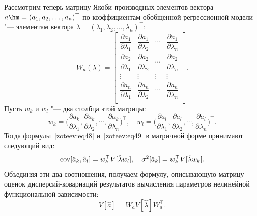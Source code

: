 Рассмотрим теперь матрицу Якоби производных элементов вектора $a\hm=(a_1,a_2,\dots,a_n)^{\top}$ по коэффициентам обобщенной регрессионной модели "--- элементам вектора $\lambda=(\lambda_1, \lambda_2,\dots,\lambda_n)^{\top}$:
$$
W_a(\lambda)=\begin{bmatrix}
\dfrac{\partial a_1}{\partial \lambda_1} & \dfrac{\partial a_1}{\partial \lambda_2} & \cdots & \dfrac{\partial a_1}{\partial \lambda_n} \\
\dfrac{\partial a_2}{\partial \lambda_1} & \dfrac{\partial a_2}{\partial \lambda_2} & \cdots & \dfrac{\partial a_2}{\partial \lambda_n} \\
\vdots & \vdots  & \vdots & \vdots \\
\dfrac{\partial a_n}{\partial \lambda_1} & \dfrac{\partial a_n}{\partial \lambda_2} & \cdots & \dfrac{\partial a_n}{\partial \lambda_n} \\
\end{bmatrix}.
$$
Пусть $w_k$ и $w_l$ "--- два столбца этой матрицы:
$$w_k=\Big(\dfrac{\partial a_k}{\partial \lambda_1}, \dfrac{\partial a_k}{\partial \lambda_2},\cdots, \dfrac{\partial a_k}{\partial \lambda_n}\Big)^{\top},  \quad 
w_l=\Big(\dfrac{\partial a_l}{\partial \lambda_1}, \dfrac{\partial a_l}{\partial \lambda_2},\cdots, \dfrac{\partial a_l}{\partial \lambda_n}\Big)^{\top}.$$
Тогда формулы~\eqref{zoteev:eq48} и~\eqref{zoteev:eq49} в матричной форме принимают следующий вид: 
$$
\mathop{\rm cov}[\hat{a}_k,\hat{a}_l]=w_k^{\top}V[\hat{\lambda}w_l], \quad \sigma^2[\hat{a}_k]=w_k^{\top}V[\hat{\lambda}w_k].$$ 
Объединяя эти два соотношения, получаем формулу, описывающую матрицу оценок дисперсий-ковариаций результатов вычисления параметров нелинейной функциональной зависимости:
\begin{equation}
V[\hat{a}]=W_aV[\hat{\lambda}]W_a^{\top}.
\label{zoteev:eq50}
\end{equation}

\vspace{-3mm}

